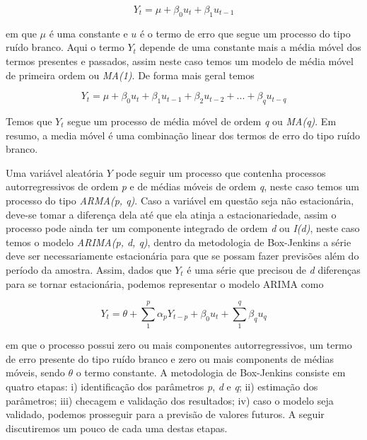 \documentclass[twocolumn]{rbef}
\newcommand{\1}{\mathbbm{1}}
\begin{document}
\begin{equation}
    Y_{t} = \mu + \beta_{0} u_{t} + \beta_{1} u_{t-1}
\end{equation}

em que $\mu$ é uma constante e $u$ é o termo de erro que segue um processo do tipo ruído branco. Aqui o termo $Y_{t}$ depende de uma constante mais a média móvel dos termos presentes e passados, assim neste caso temos um modelo de média móvel de primeira ordem ou \textit{MA(1)}. De forma mais geral temos

\begin{equation}
    Y_{t} = \mu + \beta_{0} u_{t} + \beta_{1} u_{t-1} + \beta_{2} u_{t-2} + ... + \beta_{q} u_{t-q}
\end{equation}

Temos que $Y_{t}$ segue um processo de média móvel de ordem \textit{q} ou \textit{MA(q)}. Em resumo, a media móvel é uma combinação linear dos termos de erro do tipo ruído branco.

Uma variável aleatória $Y$ pode seguir um processo que contenha processos autorregressivos de ordem \textit{p} e de médias móveis de ordem \textit{q}, neste caso temos um processo do tipo \textit{ARMA(p, q)}. Caso a variável em questão seja não estacionária, deve-se tomar a diferença dela até que ela atinja a estacionariedade, assim o processo pode ainda ter um componente integrado de ordem \textit{d} ou \textit{I(d)}, neste caso temos o modelo \textit{ARIMA(p, d, q)}, dentro da metodologia de Box-Jenkins\cite{Box-Jenkins} a série deve ser necessariamente estacionária para que se possam fazer previsões além do período da amostra. Assim, dados que $Y_{t}$ é uma série que precisou de \textit{d} diferenças para se tornar estacionária, podemos representar o modelo ARIMA como

\begin{equation}
    Y_{t} = \theta + \sum_{1}^{p} \alpha_{p} Y_{t-p} + \beta_{0} u_{t} + \sum_{1}^{q} \beta_{q} u_{q}
\end{equation}

em que o processo possui zero ou mais componentes autorregressivos, um termo de erro presente do tipo ruído branco e zero ou mais components de médias móveis, sendo $\theta$ o termo constante. A metodologia de Box-Jenkins\cite{Box-Jenkins} consiste em quatro etapas: i) identificação dos parâmetros \textit{p}, \textit{d} e \textit{q}; ii) estimação dos parâmetros; iii) checagem e validação dos resultados; iv) caso o modelo seja validado, podemos prosseguir para a previsão de valores futuros. A seguir discutiremos um pouco de cada uma destas etapas.
\end{document}
